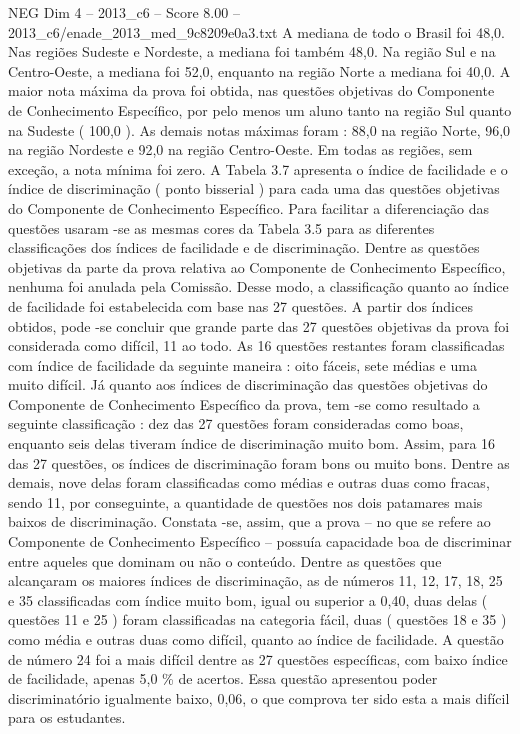 \begin{textsample}{NEG Dim 4 – 2013\_c6 – Score 8.00 – 2013\_c6/enade\_2013\_med\_9c8209e0a3.txt}
A mediana de todo o Brasil foi 48,0.
Nas regiões Sudeste e Nordeste, a mediana foi também 48,0.
Na região Sul e na Centro-Oeste, a mediana foi 52,0, enquanto na região Norte a mediana foi 40,0.
A maior nota máxima da prova foi obtida, nas questões objetivas do Componente de Conhecimento Específico, por pelo menos um aluno tanto na região Sul quanto na Sudeste ( 100,0 ).
As demais notas máximas foram : 88,0 na região Norte, 96,0 na região Nordeste e 92,0 na região Centro-Oeste.
Em todas as regiões, sem exceção, a nota mínima foi zero.
A Tabela 3.7 apresenta o índice de facilidade e o índice de discriminação ( ponto bisserial ) para cada uma das questões objetivas do Componente de Conhecimento Específico.
Para facilitar a diferenciação das questões usaram -se as mesmas cores da Tabela 3.5 para as diferentes classificações dos índices de facilidade e de discriminação.
Dentre as questões objetivas da parte da prova relativa ao Componente de Conhecimento Específico, nenhuma foi anulada pela Comissão.
Desse modo, a classificação quanto ao índice de facilidade foi estabelecida com base nas 27 questões.
A partir dos índices obtidos, pode -se concluir que grande parte das 27 questões objetivas da prova foi considerada como difícil, 11 ao todo.
As 16 questões restantes foram classificadas com índice de facilidade da seguinte maneira : oito fáceis, sete médias e uma muito difícil.
Já quanto aos índices de discriminação das questões objetivas do Componente de Conhecimento Específico da prova, tem -se como resultado a seguinte classificação : dez das 27 questões foram consideradas como boas, enquanto seis delas tiveram índice de discriminação muito bom.
Assim, para 16 das 27 questões, os índices de discriminação foram bons ou muito bons.
Dentre as demais, nove delas foram classificadas como médias e outras duas como fracas, sendo 11, por conseguinte, a quantidade de questões nos dois patamares mais baixos de discriminação.
Constata -se, assim, que a prova – no que se refere ao Componente de Conhecimento Específico – possuía capacidade boa de discriminar entre aqueles que dominam ou não o conteúdo.
Dentre as questões que alcançaram os maiores índices de discriminação, as de números 11, 12, 17, 18, 25 e 35 classificadas com índice muito bom, igual ou superior a 0,40, duas delas ( questões 11 e 25 ) foram classificadas na categoria fácil, duas ( questões 18 e 35 ) como média e outras duas como difícil, quanto ao índice de facilidade.
A questão de número 24 foi a mais difícil dentre as 27 questões específicas, com baixo índice de facilidade, apenas 5,0 \% de acertos.
Essa questão apresentou poder discriminatório igualmente baixo, 0,06, o que comprova ter sido esta a mais difícil para os estudantes.

\end{textsample}
